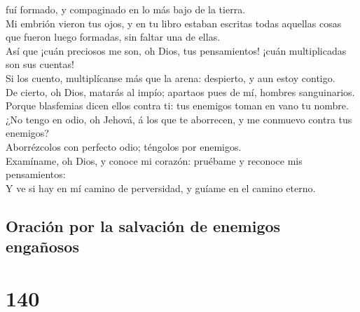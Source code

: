 fuí formado, y compaginado en lo más bajo de la tierra.\\
 Mi embrión vieron tus ojos, y en tu libro estaban
escritas todas aquellas cosas que fueron luego formadas, sin faltar una
de ellas.\\
 Así que ¡cuán preciosos me son, oh Dios, tus
pensamientos! ¡cuán multiplicadas son sus cuentas!\\
 Si los cuento, multiplícanse más que la arena:
despierto, y aun estoy contigo.\\
 De cierto, oh Dios, matarás al impío; apartaos pues de
mí, hombres sanguinarios.\\
 Porque blasfemias dicen ellos contra ti: tus enemigos
toman en vano tu nombre.\\
 ¿No tengo en odio, oh Jehová, á los que te aborrecen, y
me conmuevo contra tus enemigos?\\
 Aborrézcolos con perfecto odio; téngolos por enemigos.\\
 Examíname, oh Dios, y conoce mi corazón: pruébame y
reconoce mis pensamientos:\\
 Y ve si hay en mí camino de perversidad, y guíame en el
camino eterno.

\hypertarget{oraciuxf3n-por-la-salvaciuxf3n-de-enemigos-engauxf1osos}{%
\subsection{Oración por la salvación de enemigos
engañosos}\label{oraciuxf3n-por-la-salvaciuxf3n-de-enemigos-engauxf1osos}}

\hypertarget{section-139}{%
\section{140}\label{section-139}}

